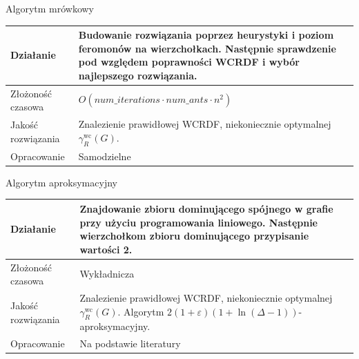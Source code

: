 \documentclass[polish,aspectratio=169]{beamer}
\begin{document}
\begin{frame}{Algorytm mrówkowy}
    \begin{table}
        \centering
        \begin{tabular}{|p{4cm}|p{10cm}|}
        \hline
        Działanie & Budowanie rozwiązania poprzez heurystyki i poziom feromonów na wierzchołkach. Następnie sprawdzenie pod względem poprawności WCRDF i wybór najlepszego rozwiązania.  \\
        \hline
        Złożoność czasowa & $O(num\_iterations \cdot num\_ants \cdot n^2)$  \\
        \hline
        Jakość rozwiązania & Znalezienie prawidłowej WCRDF, niekoniecznie optymalnej $\gamma^{\mathrm{wc}}_R(G)$.\\
        \hline
        Opracowanie & Samodzielne  \\
        \hline
        \end{tabular}
        \label{tab:mrowkowy}
    \end{table}
\end{frame}

\begin{frame}{Algorytm aproksymacyjny}
    \begin{table}
        \centering
        \begin{tabular}{|p{4cm}|p{10cm}|}
        \hline
        Działanie & Znajdowanie zbioru dominującego spójnego w grafie przy użyciu programowania liniowego. Następnie wierzchołkom zbioru dominującego przypisanie wartości 2.  \\
        \hline
        Złożoność czasowa & Wykładnicza  \\
        \hline
        Jakość rozwiązania & Znalezienie prawidłowej WCRDF, niekoniecznie optymalnej $\gamma^{\mathrm{wc}}_R(G)$. Algorytm $2(1 + \varepsilon)(1 + \ln(\Delta - 1))$-aproksymacyjny.\\
        \hline
        Opracowanie & Na podstawie literatury  \\
        \hline
        \end{tabular}
        \label{tab:aproksymacyjny}
    \end{table}
\end{frame}
\end{document}
